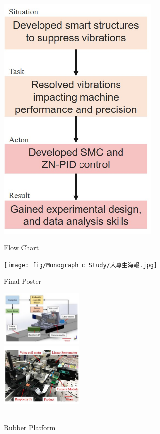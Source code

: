 \documentclass[10pt, letterpaper]{article}
\begin{document}
    \begin{figure}[!b] %
        \vspace*{-1.5cm}  %
        \begin{minipage}[c]{0.33\linewidth}
            \centering
            \includegraphics[width=0.7\textwidth]{fig/Monographic Study/專題流程圖.jpg}
            \caption{Flow Chart}
        \end{minipage}%
        \begin{minipage}[c]{0.33\linewidth}
            \centering
            \texttt{[image: fig/Monographic Study/大專生海報.jpg]}
            \caption{Final Poster}
        \end{minipage}%
        \begin{minipage}[c]{0.33\linewidth}
            \centering
            \includegraphics[width=4cm]{fig/Monographic Study/光學檢測平台示意圖.png} \\
            \includegraphics[width=4cm]{fig/Monographic Study/光學檢測平台示實際圖.png}
            \caption{\\Rubber Platform}
        \end{minipage}


\end{figure}
\end{document}
